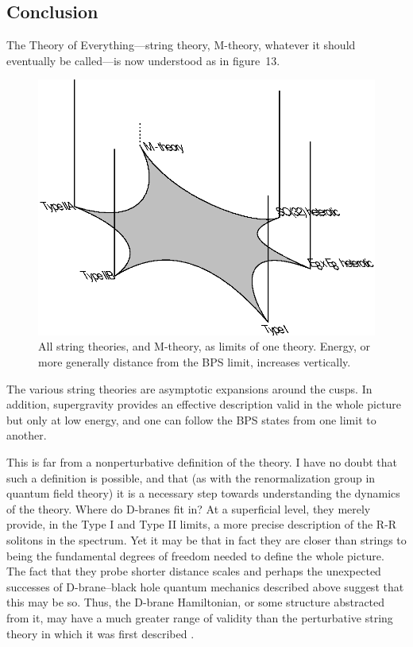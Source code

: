 \documentclass[12pt]{article}
\begin{document}
\subsection{Conclusion}

The Theory of Everything---string theory, M-theory, whatever it should
eventually be called---is now understood as in figure~13.
\begin{figure}
\begin{center}
\leavevmode
\includegraphics{tilt.eps}
\end{center}
\caption[]{All string theories, and M-theory, as limits of one theory. 
Energy, or more generally  distance from the BPS limit, increases vertically.}
\end{figure}
The various string theories are asymptotic expansions around the 
cusps.  In addition, supergravity provides an effective description valid in
the whole picture but only at low energy, and one can follow the
BPS states from one limit to another.

This is far from a nonperturbative definition of the theory.  I have no doubt
that such a definition is possible, and that (as with the renormalization
group in quantum field theory) it is a necessary step towards understanding
the dynamics of the theory. Where do D-branes fit in?  At a superficial
level, they merely provide, in the Type I and Type II limits, a more precise
description of the R-R solitons in the spectrum.  Yet it may be that in fact
they are closer than strings to being the fundamental degrees of freedom
needed to define the whole picture.  The fact that they probe shorter
distance scales \cite{short} and perhaps the unexpected successes of 
D-brane--black hole quantum mechanics described above suggest that this may
be so.  Thus, the D-brane Hamiltonian, or some structure abstracted from
it, may have a much greater range of validity than the perturbative
string theory in which it was first described \cite{bfss}.
\end{document}
